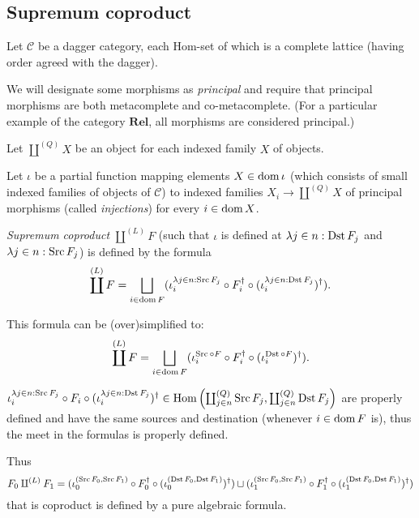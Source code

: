 \subsection{Supremum coproduct}

Let $\mathcal{C}$ be a dagger category, each Hom-set of which is a complete
lattice (having order agreed with the dagger).

We will designate some morphisms as \emph{principal} and require that
principal morphisms are both metacomplete and co-metacomplete. (For a
particular example of the category $\mathbf{Rel}$, all morphisms are
considered principal.)

Let $\coprod^{(Q)} X$ be an object for each indexed family $X$ of objects.

Let $\iota$ be a partial function mapping elements $X \in \operatorname{dom} \iota$
(which consists of small indexed families of objects of $\mathcal{C}$) to
indexed families $X_i \rightarrow \coprod^{(Q)} X$ of principal morphisms
(called \emph{injections}) for every $i \in \operatorname{dom} X$.

\begin{defn}
  \emph{Supremum coproduct} $\coprod^{(L)} F$ (such that $\iota$ is defined
  at $\lambda j \in n : \operatorname{Dst} F_j$ and $\lambda j \in n : \operatorname{Src}
  F_j$) is defined by the formula
  \[ \coprod^{(L)} F = \bigsqcup_{i \in \dom F} (\iota^{\lambda j \in n
     : \Src F_j}_i \circ F_i^{\dagger} \circ (\iota^{\lambda j \in n :
     \Dst F_j}_i)^{\dagger}) . \]
\end{defn}

This formula can be (over)simplified to:
\[ \coprod^{(L)} F = \bigsqcup_{i \in \dom F} (\iota^{\Src \circ
   F}_i \circ F_i^{\dagger} \circ (\iota^{\Dst \circ F}_i)^{\dagger}) .
\]

\begin{rem}
  $\iota^{\lambda j \in n : \operatorname{Src} F_j}_i \circ F_i \circ (\iota^{\lambda
  j \in n : \operatorname{Dst} F_j}_i)^{\dagger} \in \operatorname{Hom} \left(
  \coprod^{(Q)}_{j \in n} \operatorname{Src} F_j , \coprod^{(Q)}_{j \in n} \operatorname{Dst}
  F_j \right)$ are properly defined and have the same sources and destination
  (whenever $i \in \operatorname{dom} F$ is), thus the meet in the formulas is
  properly defined.
\end{rem}

\begin{rem}
  Thus
  \[ F_0 \amalg^{(L)} F_1 = (\iota^{(\operatorname{Src} F_0 , \operatorname{Src} F_1)}_0 \circ
     F_0^{\dagger} \circ (\iota^{(\operatorname{Dst} F_0 , \operatorname{Dst}
     F_1)}_0)^{\dagger}) \sqcup (\iota^{(\operatorname{Src} F_0 , \operatorname{Src} F_1)}_1
     \circ F_1^{\dagger} \circ (\iota^{(\operatorname{Dst} F_0 , \operatorname{Dst}
     F_1)}_1)^{\dagger}) \]
  that is coproduct is defined by a pure algebraic formula.
\end{rem}

